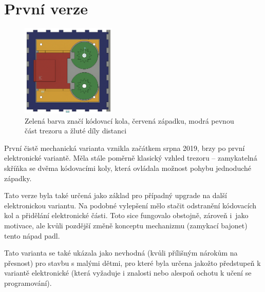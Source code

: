 \section{První verze}
\label{M1-vyvoj}

\begin{figure}
    \centering
    \includegraphics[width=0.4\textwidth]{kapitoly/obrazky/M1/mechanizmus.png} %
    \caption{Zelená barva značí kódovací kola, červená západku, modrá pevnou část trezoru a žluté díly distanci \centering}
    \label{fig:M1-mechanizmus}
\end{figure}
První čistě mechanická varianta vznikla začátkem srpna 2019, brzy po první  elektronické variantě.
Měla stále poměrně klasický vzhled trezoru -- zamykatelná skříňka se dvěma  kódovacími koly, která ovládala možnost pohybu jednoduché západky.

Tato verze byla také určená jako základ pro případný upgrade na další elektronickou
variantu. Na podobné vylepšení mělo stačit odstranění kódo\-va\-cích kol a přidělání elektronické části. Toto sice fungovalo obstojně, zároveň 
i~jako motivace, ale kvůli pozdější změně konceptu mechanizmu (zamykací bajonet) tento nápad padl.

Tato varianta se také ukázala jako nevhodná (kvůli přílišným nárokům na přesnost) pro stavbu s malými dětmi, pro které byla určena jakožto předstupeň 
k variantě elektronické (která vyžaduje i znalosti nebo alespoň ochotu k učení se programování).

\newpage